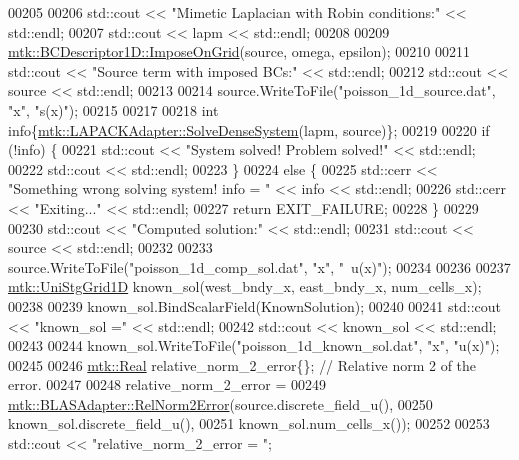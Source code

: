 \begin{DoxyCode}
00205 
00206   std::cout << \textcolor{stringliteral}{"Mimetic Laplacian with Robin conditions:"} << std::endl;
00207   std::cout << lapm << std::endl;
00208 
00209   \hyperlink{classmtk_1_1BCDescriptor1D_adfb101c1a12b452f83dacd207febea0a}{mtk::BCDescriptor1D::ImposeOnGrid}(source, omega, epsilon);
00210 
00211   std::cout << \textcolor{stringliteral}{"Source term with imposed BCs:"} << std::endl;
00212   std::cout << source << std::endl;
00213 
00214   source.WriteToFile(\textcolor{stringliteral}{"poisson\_1d\_source.dat"}, \textcolor{stringliteral}{"x"}, \textcolor{stringliteral}{"s(x)"});
00215 
00217 
00218   \textcolor{keywordtype}{int} info\{\hyperlink{classmtk_1_1LAPACKAdapter_a7428bccf74fd4a4af68fb7233846da22}{mtk::LAPACKAdapter::SolveDenseSystem}(lapm, source)\};
00219 
00220   \textcolor{keywordflow}{if} (!info) \{
00221     std::cout << \textcolor{stringliteral}{"System solved! Problem solved!"} << std::endl;
00222     std::cout << std::endl;
00223   \}
00224   \textcolor{keywordflow}{else} \{
00225     std::cerr << \textcolor{stringliteral}{"Something wrong solving system! info = "} << info << std::endl;
00226     std::cerr << \textcolor{stringliteral}{"Exiting..."} << std::endl;
00227     \textcolor{keywordflow}{return} EXIT\_FAILURE;
00228   \}
00229 
00230   std::cout << \textcolor{stringliteral}{"Computed solution:"} << std::endl;
00231   std::cout << source << std::endl;
00232 
00233   source.WriteToFile(\textcolor{stringliteral}{"poisson\_1d\_comp\_sol.dat"}, \textcolor{stringliteral}{"x"}, \textcolor{stringliteral}{"~u(x)"});
00234 
00236 
00237   \hyperlink{classmtk_1_1UniStgGrid1D}{mtk::UniStgGrid1D} known\_sol(west\_bndy\_x, east\_bndy\_x, num\_cells\_x);
00238 
00239   known\_sol.BindScalarField(KnownSolution);
00240 
00241   std::cout << \textcolor{stringliteral}{"known\_sol ="} << std::endl;
00242   std::cout << known\_sol << std::endl;
00243 
00244   known\_sol.WriteToFile(\textcolor{stringliteral}{"poisson\_1d\_known\_sol.dat"}, \textcolor{stringliteral}{"x"}, \textcolor{stringliteral}{"u(x)"});
00245 
00246   \hyperlink{group__c01-roots_gac080bbbf5cbb5502c9f00405f894857d}{mtk::Real} relative\_norm\_2\_error\{\};  \textcolor{comment}{// Relative norm 2 of the error.}
00247 
00248   relative\_norm\_2\_error =
00249     \hyperlink{classmtk_1_1BLASAdapter_af2ac5691f45e67d6e26186b071119ec4}{mtk::BLASAdapter::RelNorm2Error}(source.discrete\_field\_u(),
00250                                     known\_sol.discrete\_field\_u(),
00251                                     known\_sol.num\_cells\_x());
00252 
00253   std::cout << \textcolor{stringliteral}{"relative\_norm\_2\_error = "};

\end{DoxyCode}

